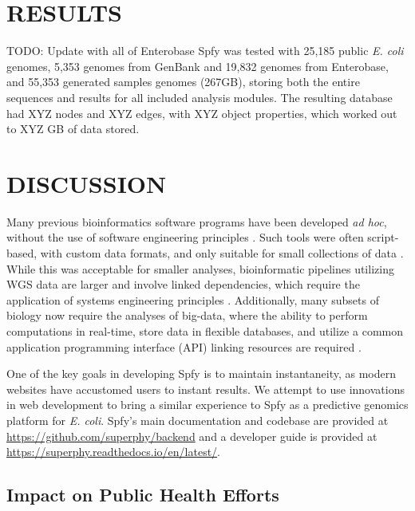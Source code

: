 \documentclass[a4,center,fleqn]{NAR}
\begin{document}
\section{RESULTS}
TODO: Update with all of Enterobase
Spfy was tested with 25,185 public \textit{E. coli} genomes, 5,353 genomes from GenBank and 19,832 genomes from Enterobase, and 55,353 generated samples genomes (267GB), storing both the entire sequences and results for all included analysis modules.
The resulting database had XYZ nodes and XYZ edges, with XYZ object properties, which worked out to XYZ GB of data stored.



\section{DISCUSSION}

Many previous bioinformatics software programs have been developed \textit{ad hoc}, without the use of software engineering principles \cite{de2015trends}.
Such tools were often script-based, with custom data formats, and only suitable for small collections of data \cite{de2015trends}.
While this was acceptable for smaller analyses, bioinformatic pipelines utilizing WGS data are larger and involve linked dependencies, which require the application of systems engineering principles \cite{schatz2015biological}.
Additionally, many subsets of biology now require the analyses of big-data, where the ability to perform computations in real-time, store data in flexible databases, and utilize a common application programming interface (API) linking resources are required \cite{swaminathan2016review}.

One of the key goals in developing Spfy is to maintain instantaneity, as modern websites have accustomed users to instant results.
We attempt to use innovations in web development to bring a similar experience to Spfy as a predictive genomics platform for \textit{E. coli}.
Spfy's main documentation and codebase are provided at \url{https://github.com/superphy/backend} and a developer guide is provided at \url{https://superphy.readthedocs.io/en/latest/}.

\subsection{Impact on Public Health Efforts}
\end{document}
